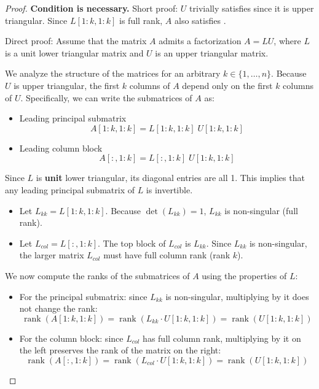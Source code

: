 \documentclass{article}
\DeclareMathOperator{\rk}{rank}
\begin{document}
\begin{proof} \par
    \textbf{Condition is necessary.} \quad Short proof: $U$ trivially satisfies  since it is upper triangular. Since $L[1:k,1:k]$ is full rank, $A$ also satisfies .

    Direct proof: Assume that the matrix $A$ admits a factorization $A = LU$, where $L$ is a unit lower triangular matrix and $U$ is an upper triangular matrix.

    We analyze the structure of the matrices for an arbitrary $k \in \{1, \dots, n\}$.
    Because $U$ is upper triangular, the first $k$ columns of $A$ depend only on the first $k$ columns of $U$. Specifically, we can write the submatrices of $A$ as:

    \begin{itemize}
        \item Leading principal submatrix
        \[ A[1:k, 1:k] = L[1:k, 1:k] \; U[1:k, 1:k] \]
        \item Leading column block
        \[ A[:, 1:k] = L[:, 1:k] \; U[1:k, 1:k] \]
    \end{itemize}

    Since $L$ is \textbf{unit} lower triangular, its diagonal entries are all 1. This implies that any leading principal submatrix of $L$ is invertible.
    \begin{itemize}
        \item Let $L_{kk} = L[1:k, 1:k]$. Because $\det(L_{kk}) = 1$, $L_{kk}$ is non-singular (full rank).
        \item Let $L_{col} = L[:, 1:k]$. The top block of $L_{col}$ is $L_{kk}$. Since $L_{kk}$ is non-singular, the larger matrix $L_{col}$ must have full column rank (rank $k$).
    \end{itemize}

    We now compute the ranks of the submatrices of $A$ using the properties of $L$:
    \begin{itemize}
        \item For the principal submatrix: since $L_{kk}$ is non-singular, multiplying by it does not change the rank:
        \[ \rk(A[1:k, 1:k]) = \rk(L_{kk} \cdot U[1:k, 1:k]) = \rk(U[1:k, 1:k]) \]
        \item For the column block: since $L_{col}$ has full column rank, multiplying by it on the left preserves the rank of the matrix on the right:
        \[ \rk(A[:, 1:k]) = \rk(L_{col} \cdot U[1:k, 1:k]) = \rk(U[1:k, 1:k]) \]
    \end{itemize}


\end{proof}
\end{document}

